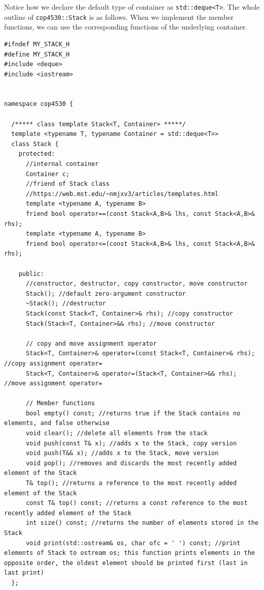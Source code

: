\documentclass[12pt]{book}
\begin{document}
Notice how we declare the default type of container as \texttt{std::deque<T>}. The whole outline of \texttt{cop4530::Stack} is as follows. When we implement the member functions, we can use the corresponding functions of the underlying container. 
\begin{verbatim}
#ifndef MY_STACK_H
#define MY_STACK_H
#include <deque>
#include <iostream>


namespace cop4530 {

  /***** class template Stack<T, Container> *****/
  template <typename T, typename Container = std::deque<T>>
  class Stack {
    protected:
      //internal container
      Container c;
      //friend of Stack class
      //https://web.mst.edu/~nmjxv3/articles/templates.html
      template <typename A, typename B>
      friend bool operator==(const Stack<A,B>& lhs, const Stack<A,B>& rhs);      
      template <typename A, typename B>
      friend bool operator<=(const Stack<A,B>& lhs, const Stack<A,B>& rhs);

    public:
      //constructor, destructor, copy constructor, move constructor
      Stack(); //default zero-argument constructor
      ~Stack(); //destructor
      Stack(const Stack<T, Container>& rhs); //copy constructor
      Stack(Stack<T, Container>&& rhs); //move constructor

      // copy and move assignment operator
      Stack<T, Container>& operator=(const Stack<T, Container>& rhs); //copy assignment operator=
      Stack<T, Container>& operator=(Stack<T, Container>&& rhs); //move assignment operator=

      // Member functions
      bool empty() const; //returns true if the Stack contains no elements, and false otherwise
      void clear(); //delete all elements from the stack
      void push(const T& x); //adds x to the Stack, copy version
      void push(T&& x); //adds x to the Stack, move version 
      void pop(); //removes and discards the most recently added element of the Stack 
      T& top(); //returns a reference to the most recently added element of the Stack 
      const T& top() const; //returns a const reference to the most recently added element of the Stack
      int size() const; //returns the number of elements stored in the Stack
      void print(std::ostream& os, char ofc = ' ') const; //print elements of Stack to ostream os; this function prints elements in the opposite order, the oldest element should be printed first (last in last print)            
  };


\end{verbatim}
\end{document}
